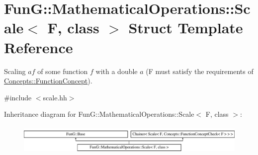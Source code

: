 \hypertarget{structFunG_1_1MathematicalOperations_1_1Scale}{}\section{Fun\+G\+:\+:Mathematical\+Operations\+:\+:Scale$<$ F, class $>$ Struct Template Reference}
\label{structFunG_1_1MathematicalOperations_1_1Scale}


Scaling $ af $ of some function $ f $ with a double $ a $ (F must satisfy the requirements of \hyperlink{structFunG_1_1Concepts_1_1FunctionConcept}{Concepts\+::\+Function\+Concept}).  




{\ttfamily \#include $<$scale.\+hh$>$}

Inheritance diagram for Fun\+G\+:\+:Mathematical\+Operations\+:\+:Scale$<$ F, class $>$\+:\begin{figure}[H]
\begin{center}
\leavevmode
\includegraphics[height=1.454545cm]{structFunG_1_1MathematicalOperations_1_1Scale}
\end{center}
\end{figure}
